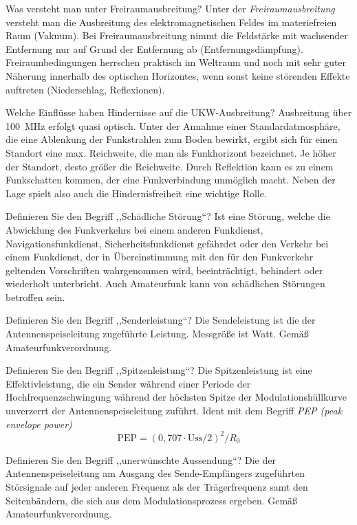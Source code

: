 \documentclass[avery5371,grid,frame,a4paper]{flashcards}
\newcommand{\card}[3]{
  \begin{flashcard}[{\chap} -- #1]{#2}#3\end{flashcard}
}
\begin{document}
\card{51}{Was versteht man unter Freiraumausbreitung?}{
  Unter der \emph{Freiraumausbreitung} versteht man die Ausbreitung des elektromagnetischen Feldes im materiefreien Raum (Vakuum). Bei Freiraumausbreitung nimmt die Feldstärke mit wachsender Entfernung nur auf Grund der Entfernung ab (Entfernungsdämpfung). Freiraumbedingungen herrschen praktisch im Weltraum und noch mit sehr guter Näherung innerhalb des optischen Horizontes, wenn sonst keine störenden Effekte auftreten (Niederschlag, Reflexionen).
}
\card{52}{Welche Einflüsse haben Hindernisse auf die UKW-Ausbreitung?}{
  Ausbreitung über \SI{100}{\mega\Hz} erfolgt quasi optisch. Unter der Annahme einer Standardatmosphäre, die eine Ablenkung der Funkstrahlen zum Boden bewirkt, ergibt sich für einen Standort eine max. Reichweite, die man als Funkhorizont bezeichnet. Je höher der Standort, desto größer die Reichweite. Durch Reflektion kann es zu einem Funkschatten kommen, der eine Funkverbindung unmöglich macht. Neben der Lage spielt also auch die Hindernisfreiheit eine wichtige Rolle.
}
\card{53}{Definieren Sie den Begriff ,,Schädliche Störung``?}{
  Ist eine Störung, welche die Abwicklung des Funkverkehrs bei einem anderen Funkdienst, Navigationsfunkdienst, Sicherheitsfunkdienst gefährdet oder den Verkehr bei einem Funkdienst, der in Übereinstimmung mit den für den Funkverkehr geltenden Vorschriften wahrgenommen wird, beeinträchtigt, behindert oder wiederholt unterbricht. Auch Amateurfunk kann von schädlichen Störungen betroffen sein.
}
\card{54}{Definieren Sie den Begriff ,,Senderleistung``?}{
  Die Sendeleistung ist die der Antennenspeiseleitung zugeführte Leistung. Messgröße ist Watt. Gemäß Amateurfunkverordnung.
}
\card{55}{Definieren Sie den Begriff ,,Spitzenleistung``?}{
  Die Spitzenleistung ist eine Effektivleistung, die ein Sender während einer Periode der Hochfrequenzschwingung während der höchsten Spitze der Modulationshüllkurve unverzerrt der Antennenspeiseleitung zuführt. Ident mit dem Begriff \emph{PEP (peak envelope power)}
  \[ \text{PEP} = (0,707 \cdot \text{Uss}/2)^2 / R_0 \]
}
\card{56}{Definieren Sie den Begriff ,,unerwünschte Aussendung``?}{
  Die der Antennenspeiseleitung am Ausgang des Sende-Empfängers zugeführten Störsignale auf jeder anderen Frequenz als der Trägerfrequenz samt den Seitenbändern, die sich aus dem Modulationsprozess ergeben. Gemäß Amateurfunkverordnung.
}
\end{document}
